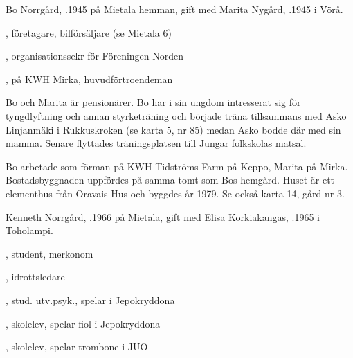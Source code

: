 


Bo Norrgård, .1945  på Mietala hemman, gift med Marita Nygård, .1945 i Vörå.
\begin{jhchildren}
  \item {}, företagare, bilförsäljare (se Mietala 6)
  \item {}, organisationssekr för Föreningen Norden
  \item {}, på KWH Mirka, huvudförtroendeman
\end{jhchildren}

Bo och Marita är pensionärer. Bo har i sin ungdom intresserat sig för tyngdlyftning och annan styrketräning och började träna tillsammans med Asko Linjanmäki i Rukkuskroken (se karta 5, nr 85) medan Asko bodde där med sin mamma. Senare flyttades träningsplatsen till Jungar folkskolas matsal.

Bo arbetade som förman på KWH Tidströms Farm på Keppo, Marita på Mirka. Bostadsbyggnaden uppfördes på samma tomt som Bos hemgård. Huset är ett elementhus från Oravais Hus och byggdes år 1979. Se också karta 14, gård nr 3.






Kenneth Norrgård, .1966 på Mietala, gift med Elisa Korkiakangas, .1965 i Toholampi.
\begin{jhchildren}
  \item {}, student, merkonom
  \item {}, idrottsledare
  \item {}, stud. utv.psyk., spelar i Jepokryddona
  \item {}, skolelev, spelar fiol i Jepokryddona
  \item {}, skolelev, spelar trombone i JUO
\end{jhchildren}

